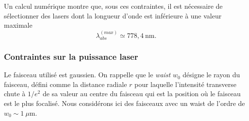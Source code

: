 Un calcul numérique montre que, sous ces contraintes, il est nécessaire de sélectionner des lasers dont la longueur d’onde est inférieure à une valeur maximale 
\[
\lambda^{(max)}_{abs} \simeq  778{,}4~\text{nm}.
\]



\subsubsection*{Contraintes sur la puissance laser}



Le faisceau utilisé est gaussien. On rappelle que le \textit{waist} $w_0$ désigne le rayon du faisceau, défini comme la distance radiale $r$ pour laquelle l’intensité transverse chute à $1/e^2$ de sa valeur au centre du faisceau qui est la position où le faisceau est le plus focalisé. Nous considérons ici des faisceaux avec un waist de l’ordre de $w_0 \sim 1~\mu\text{m}$.  

